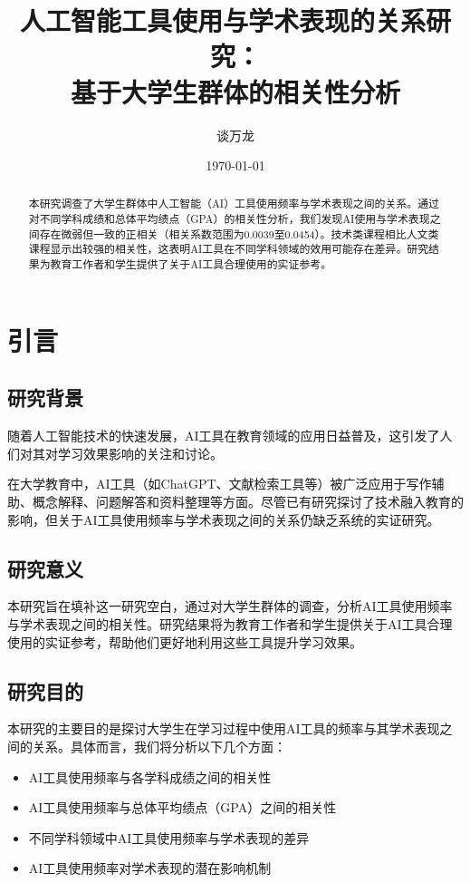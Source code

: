 \documentclass[a4paper,12pt]{article}
\title[人工智能工具使用与学术表现的关系研究：基于大学生群体的相关性分析]{人工智能工具使用与学术表现的关系研究：\\基于大学生群体的相关性分析}
\author{谈万龙}
\date{\today}
\begin{document}
\maketitle

\begin{abstract}
本研究调查了大学生群体中人工智能（AI）工具使用频率与学术表现之间的关系。通过对不同学科成绩和总体平均绩点（GPA）的相关性分析，我们发现AI使用与学术表现之间存在微弱但一致的正相关（相关系数范围为0.0039至0.0454）。技术类课程相比人文类课程显示出较强的相关性，这表明AI工具在不同学科领域的效用可能存在差异。研究结果为教育工作者和学生提供了关于AI工具合理使用的实证参考。
\end{abstract}

\section{引言}
\subsection{研究背景}
随着人工智能技术的快速发展，AI工具在教育领域的应用日益普及，这引发了人们对其对学习效果影响的关注和讨论。

在大学教育中，AI工具（如ChatGPT、文献检索工具等）被广泛应用于写作辅助、概念解释、问题解答和资料整理等方面。尽管已有研究探讨了技术融入教育的影响，但关于AI工具使用频率与学术表现之间的关系仍缺乏系统的实证研究。
\subsection{研究意义}

本研究旨在填补这一研究空白，通过对大学生群体的调查，分析AI工具使用频率与学术表现之间的相关性。研究结果将为教育工作者和学生提供关于AI工具合理使用的实证参考，帮助他们更好地利用这些工具提升学习效果。

\subsection{研究目的}

本研究的主要目的是探讨大学生在学习过程中使用AI工具的频率与其学术表现之间的关系。具体而言，我们将分析以下几个方面：
\begin{itemize}
    \item AI工具使用频率与各学科成绩之间的相关性
    \item AI工具使用频率与总体平均绩点（GPA）之间的相关性
    \item 不同学科领域中AI工具使用频率与学术表现的差异
    \item AI工具使用频率对学术表现的潜在影响机制
\end{itemize}
\end{document}
